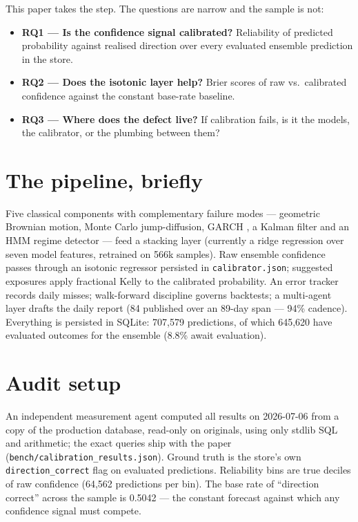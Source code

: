 \documentclass[10pt]{article}
\begin{document}
This paper takes the step. The questions are narrow and the sample is not:

\begin{itemize}
\item \textbf{RQ1 --- Is the confidence signal calibrated?} Reliability of predicted probability against realised direction over every evaluated ensemble prediction in the store.
\item \textbf{RQ2 --- Does the isotonic layer help?} Brier scores \citep{brier1950} of raw vs.\ calibrated confidence against the constant base-rate baseline.
\item \textbf{RQ3 --- Where does the defect live?} If calibration fails, is it the models, the calibrator, or the plumbing between them?
\end{itemize}

\section{The pipeline, briefly}
\label{sec:pipeline}

Five classical components with complementary failure modes --- geometric Brownian motion, Monte Carlo jump-diffusion, GARCH \citep{bollerslev1986garch}, a Kalman filter \citep{kalman1960} and an HMM regime detector --- feed a stacking layer (currently a ridge regression over seven model features, retrained on 566k samples). Raw ensemble confidence passes through an isotonic regressor \citep{zadrozny2002isotonic} persisted in \texttt{calibrator.json}; suggested exposures apply fractional Kelly to the calibrated probability. An error tracker records daily misses; walk-forward discipline governs backtests; a multi-agent layer drafts the daily report (84 published over an 89-day span --- 94\% cadence). Everything is persisted in SQLite: 707{,}579 predictions, of which 645{,}620 have evaluated outcomes for the ensemble (8.8\% await evaluation).

\section{Audit setup}
\label{sec:setup}

An independent measurement agent computed all results on 2026-07-06 from a copy of the production database, read-only on originals, using only stdlib SQL and arithmetic; the exact queries ship with the paper (\texttt{bench/calibration\_results.json}). Ground truth is the store's own \texttt{direction\_correct} flag on evaluated predictions. Reliability bins are true deciles of raw confidence (64{,}562 predictions per bin). The base rate of ``direction correct'' across the sample is 0.5042 --- the constant forecast against which any confidence signal must compete.
\end{document}
